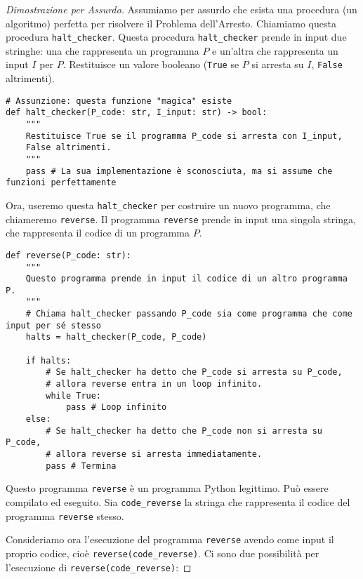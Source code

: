 \documentclass[a4paper]{article}
\begin{document}
\begin{proof}[Dimostrazione per Assurdo]
Assumiamo per assurdo che esista una procedura (un algoritmo) perfetta per risolvere il Problema dell'Arresto. Chiamiamo questa procedura \texttt{halt\_checker}.
Questa procedura \texttt{halt\_checker} prende in input due stringhe: una che rappresenta un programma $P$ e un'altra che rappresenta un input $I$ per $P$. Restituisce un valore booleano (\texttt{True} se $P$ si arresta su $I$, \texttt{False} altrimenti).

\begin{verbatim}
# Assunzione: questa funzione "magica" esiste
def halt_checker(P_code: str, I_input: str) -> bool:
    """
    Restituisce True se il programma P_code si arresta con I_input,
    False altrimenti.
    """
    pass # La sua implementazione è sconosciuta, ma si assume che funzioni perfettamente
\end{verbatim}

Ora, useremo questa \texttt{halt\_checker} per costruire un nuovo programma, che chiameremo \texttt{reverse}. Il programma \texttt{reverse} prende in input una singola stringa, che rappresenta il codice di un programma $P$.

\begin{verbatim}
def reverse(P_code: str):
    """
    Questo programma prende in input il codice di un altro programma P.
    """
    # Chiama halt_checker passando P_code sia come programma che come input per sé stesso
    halts = halt_checker(P_code, P_code)

    if halts:
        # Se halt_checker ha detto che P_code si arresta su P_code,
        # allora reverse entra in un loop infinito.
        while True:
            pass # Loop infinito
    else:
        # Se halt_checker ha detto che P_code non si arresta su P_code,
        # allora reverse si arresta immediatamente.
        pass # Termina
\end{verbatim}

Questo programma \texttt{reverse} è un programma Python legittimo. Può essere compilato ed eseguito.
Sia \texttt{code\_reverse} la stringa che rappresenta il codice del programma \texttt{reverse} stesso.

Consideriamo ora l'esecuzione del programma \texttt{reverse} avendo come input il proprio codice, cioè \texttt{reverse(code\_reverse)}.
Ci sono due possibilità per l'esecuzione di \texttt{reverse(code\_reverse)}:


\end{proof}
\end{document}
